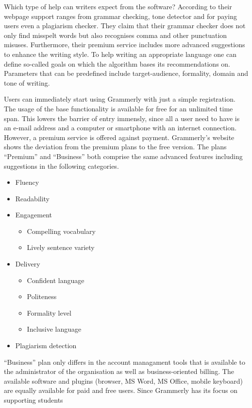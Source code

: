 \documentclass[runningheads]{llncs}
\begin{document}
Which type of help can writers expect from the software? According to their webpage \parencite{noauthor_write_nodate} support ranges from grammar checking, tone detector and for paying users even a plagiarism checker. They claim that their grammar checker does not only find misspelt words but also recognises comma and other punctuation misuses. Furthermore, their premium service includes more advanced suggestions to enhance the writing style. To help writing an appropriate language one can define so-called goals on which the algorithm bases its recommendations on. Parameters that can be predefined include target-audience, formality, domain and tone of writing.   

Users can immediately start using Grammerly with just a simple registration. The usage of the base functionality is available for free for an unlimited time span. This lowers the barrier of entry immensly, since all a user need to have is an e-mail address and a computer or smartphone with an internet connection. However, a premium service is offered against payment. Grammerly's website \citep{noauthor_write_nodate} shows the deviation from the premium plans to the free version. The plans ``Premium'' and ``Business'' both comprise the same advanced features including suggestions in the following categories.
\begin{itemize}
 \item Fluency
 \item Readability
 \item Engagement
 \begin{itemize}
  \item Compelling vocabulary
  \item Lively sentence variety
 \end{itemize}
 \item Delivery
 \begin{itemize}
  \item Confident language
  \item Politeness
  \item Formality level
  \item Inclusive language
 \end{itemize}
 \item Plagiarism detection
\end{itemize}
``Business'' plan only differs in the account managament tools that is available to the administrator of the organisation as well as business-oriented billing. The available software and plugins (browser, MS Word, MS Office, mobile keyboard) are equally available for paid and free users. Since Grammerly has its focus on supporting students  
\end{document}
